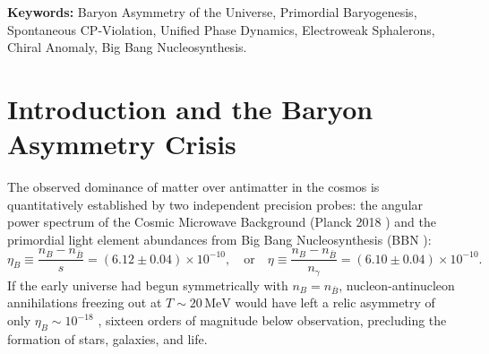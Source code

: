 \documentclass[11pt,a4paper]{article}
\begin{document}
\noindent\textbf{Keywords:} Baryon Asymmetry of the Universe, Primordial Baryogenesis, Spontaneous CP-Violation, Unified Phase Dynamics, Electroweak Sphalerons, Chiral Anomaly, Big Bang Nucleosynthesis.

\section{Introduction and the Baryon Asymmetry Crisis}

The observed dominance of matter over antimatter in the cosmos is quantitatively established by two independent precision probes: the angular power spectrum of the Cosmic Microwave Background (Planck 2018 \cite{Aghanim2020}) and the primordial light element abundances from Big Bang Nucleosynthesis (BBN \cite{Cooke2018,Fields2020}):
\begin{equation}
\eta_B \equiv \frac{n_B - n_{\bar{B}}}{s} = (6.12 \pm 0.04) \times 10^{-10}, \quad \text{or} \quad \eta \equiv \frac{n_B - n_{\bar{B}}}{n_\gamma} = (6.10 \pm 0.04) \times 10^{-10}.
\label{eq:eta_obs}
\end{equation}
If the early universe had begun symmetrically with $n_B = n_{\bar{B}}$, nucleon-antinucleon annihilations freezing out at $T \sim 20\,\mathrm{MeV}$ would have left a relic asymmetry of only $\eta_B \sim 10^{-18}$ \cite{Kolb1990}, sixteen orders of magnitude below observation, precluding the formation of stars, galaxies, and life.
\end{document}
